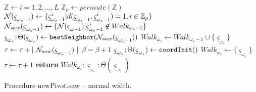\begin{algorithm}
\begin{algorithmic}[1]
\STATE $\mathbb{Z} \gets i = 1,2, \ldots ,L $ 
\STATE $\mathbb{Z}_p \gets permute(\mathbb{Z}) $ 
\STATE ${\cal N} ({\underline \varsigma}_{\omega_{s} -1}) \gets  \{{\underline \varsigma}_{\omega_{s} -1}^i | d({\underline \varsigma}_{\omega_{s} -1}, {\underline \varsigma}_{\omega_{s} -1}^i ) = 1, i \in \mathbb{Z}_p\}$ 
\STATE ${\cal N}_{saw} ({\underline \varsigma}_{\omega_{s} -1}) \gets  \{ {\cal N} ({\underline \varsigma}_{\omega -1}) |
                      {\underline \varsigma}_{\omega_{s} -1}^i \not\in  Walk_{\omega_{s} -1}\}$
        \STATE ${\underline \varsigma}_{\omega_{s}}\!:\!\Theta({\underline \varsigma}_{\omega_{s}}) \gets {\tt bestNeighbor}({\cal N}_{saw} ({\underline \varsigma}_{\omega_{s} -1}))$
        \STATE $Walk_{\omega_{s}} \gets Walk_{\omega_{s}-1} \cup \{{\underline \varsigma}_{\omega_{s}}\}$
        \STATE $\tau \gets \tau + |~{\cal N}_{saw} ({\underline \varsigma}_{\omega_{s} -1})~| $ 
        \STATE $\beta = \beta + 1$ 
        \STATE ${\underline \varsigma}_{\omega_{s}}\!:\!\Theta({\underline \varsigma}_{\omega_{s}}) \gets {\tt coordInit}()$ 
        \STATE $Walk_{\omega_{s}} \gets \{ {\underline \varsigma}_{\omega_{s}} \}$
        \STATE $\tau \gets \tau + 1 $ 
    \ENDIF
\STATE \textbf{return} $Walk_{\omega_{s}}\!:\!{\underline \varsigma}_{\omega_{s}}\!:\!\Theta({\underline \varsigma}_{\omega_{s}})$ 
\ENDPROCEDURE 
\end{algorithmic}
\caption[Algorithm file: alg-newPivot-normal.tex]{Procedure newPivot.saw -- normal width.} 
\label{alg-newPivot-normal}
\end{algorithm}